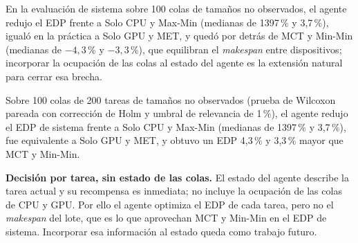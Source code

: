 
En la evaluación de sistema sobre 100 colas de tamaños no observados, el agente redujo el EDP
frente a Solo CPU y Max-Min (medianas de 1397\,\% y 3,7\,\%), igualó en la práctica a Solo GPU
y MET, y quedó por detrás de MCT y Min-Min (medianas de $-4{,}3$\,\% y $-3{,}3$\,\%), que
equilibran el \textit{makespan} entre dispositivos; incorporar la ocupación de las colas al
estado del agente es la extensión natural para cerrar esa brecha.



Sobre 100 colas de 200 tareas de tamaños no observados (prueba de Wilcoxon pareada con
corrección de Holm y umbral de relevancia de 1\,\%), el agente redujo el EDP de sistema frente
a Solo CPU y Max-Min (medianas de 1397\,\% y 3,7\,\%), fue equivalente a Solo GPU y MET, y
obtuvo un EDP 4,3\,\% y 3,3\,\% mayor que MCT y Min-Min.



\textbf{Decisión por tarea, sin estado de las colas.} El estado del agente describe la tarea
actual y su recompensa es inmediata; no incluye la ocupación de las colas de CPU y GPU. Por
ello el agente optimiza el EDP de cada tarea, pero no el \textit{makespan} del lote, que es lo
que aprovechan MCT y Min-Min en el EDP de sistema. Incorporar esa información al estado queda
como trabajo futuro.

